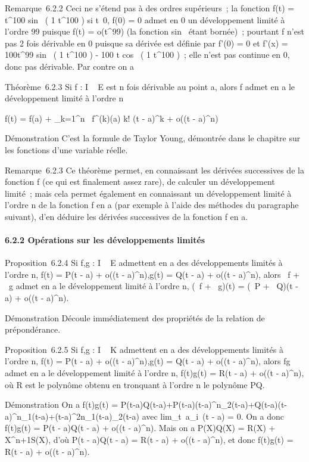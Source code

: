 \documentclass[]{article}
\begin{document}
Remarque~6.2.2 Ceci ne s'étend pas à des ordres supérieurs~; la fonction
f(t) = t^100 sin~ ( 1
\over t^100 ) si
t\neq~0, f(0) = 0 admet en 0 un développement
limité à l'ordre 99 puisque f(t) = o(t^99) (la fonction
sin~ étant bornée)~; pourtant f n'est pas 2
fois dérivable en 0 puisque sa dérivée est définie par f'(0) = 0 et
f'(x) = 100t^99 sin~ ( 1
\over t^100 ) - 100 \over
t  cos~ ( 1 \over
t^100 )~; elle n'est pas continue en 0, donc pas dérivable.
Par contre on a

Théorème~6.2.3 Si f : I \rightarrow~ E est n fois dérivable au point a, alors f
admet en a le développement limité à l'ordre n

f(t) = f(a) + \sum \_k=1^n~
f^(k)(a) \over k! (t - a)^k +
o((t - a)^n)

Démonstration C'est la formule de Taylor Young, démontrée dans le
chapitre sur les fonctions d'une variable réelle.

Remarque~6.2.3 Ce théorème permet, en connaissant les dérivées
successives de la fonction f (ce qui est finalement assez rare), de
calculer un développement limité~; mais cela permet également en
connaissant un développement limité à l'ordre n de la fonction f en a
(par exemple à l'aide des méthodes du paragraphe suivant), d'en déduire
les dérivées successives de la fonction f en a.

\paragraph{6.2.2 Opérations sur les développements limités}

Proposition~6.2.4 Si f,g : I \rightarrow~ E admettent en a des développements
limités à l'ordre n, f(t) = P(t - a) + o((t - a)^n),g(t) =
Q(t - a) + o((t - a)^n), alors \alpha~f + \beta~g admet en a le
développement limité à l'ordre n, (\alpha~f + \beta~g)(t) = (\alpha~P + \beta~Q)(t - a) +
o((t - a)^n).

Démonstration Découle immédiatement des propriétés de la relation de
prépondérance.

Proposition~6.2.5 Si f,g : I \rightarrow~ K admettent en a des développements
limités à l'ordre n, f(t) = P(t - a) + o((t - a)^n),g(t) =
Q(t - a) + o((t - a)^n), alors fg admet en a le développement
limité à l'ordre n, f(t)g(t) = R(t - a) + o((t - a)^n), où R
est le polynôme obtenu en tronquant à l'ordre n le polynôme PQ.

Démonstration On a f(t)g(t) =
P(t-a)Q(t-a)+P(t-a)(t-a)^n\epsilon\_2(t-a)+Q(t-a)(t-a)^n\epsilon\_1(t-a)+(t-a)^2n\epsilon\_1(t-a)\epsilon\_2(t-a)
avec lim\_t\rightarrow~a\epsilon\_i~(t - a) = 0.
On a donc f(t)g(t) = P(t - a)Q(t - a) + o((t - a)^n). Mais on
a P(X)Q(X) = R(X) + X^n+1S(X), d'où P(t - a)Q(t - a) = R(t -
a) + o((t - a)^n), et donc f(t)g(t) = R(t - a) + o((t -
a)^n).
\end{document}
